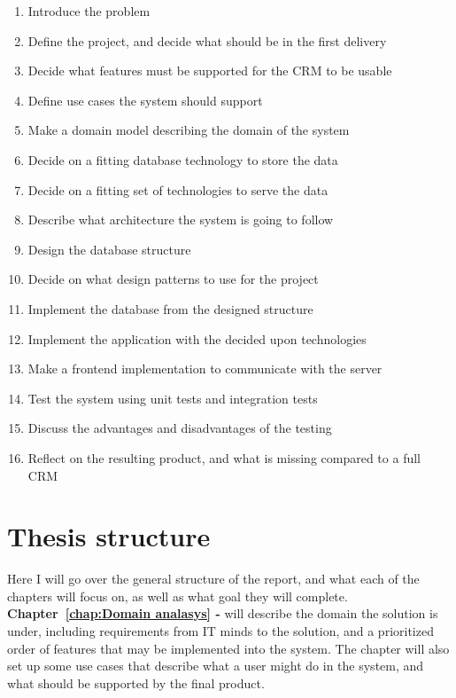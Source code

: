 \begin{enumerate}
  \item Introduce the problem
  \item Define the project, and decide what should be in the first delivery
  \item Decide what features must be supported for the CRM to be usable
  \item Define use cases the system should support
  \item Make a domain model describing the domain of the system
  \item Decide on a fitting database technology to store the data
  \item Decide on a fitting set of technologies to serve the data
  \item Describe what architecture the system is going to follow
  \item Design the database structure
  \item Decide on what design patterns to use for the project
  \item Implement the database from the designed structure
  \item Implement the application with the decided upon technologies
  \item Make a frontend implementation to communicate with the server
  \item Test the system using unit tests and integration tests
  \item Discuss the advantages and disadvantages of the testing
  \item Reflect on the resulting product, and what is missing compared to a full CRM
\end{enumerate}

\section{Thesis structure}
\label{sec:Thesis structure}
Here I will go over the general structure of the report, and what each of the chapters will focus on, as well as what goal they will complete.\\

\textbf{Chapter~\ref{chap:Domain analasys} - } will describe the domain the solution is under, including requirements from IT minds to the solution, and a prioritized order of features that may be implemented into the system. The chapter will also set up some use cases that describe what a user might do in the system, and what should be supported by the final product.

